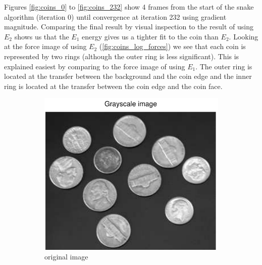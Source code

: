 \documentclass[11pt,a4paper]{article}
\begin{document}
Figures \ref{fig:coins_0} to \ref{fig:coins_232} show 4 frames from the start
of the snake algorithm (iteration 0) until convergence at iteration 232 using
gradient magnitude. Comparing the final result by visual inspection to the
result of using $E_2$ shows us that the $E_1$ energy gives us a tighter fit to
the coin than $E_2$. Looking at the force image of using $E_2$
(\ref{fig:coins_log_forces}) we see that each coin is represented by two rings
(although the outer ring is less significant). This is explained easiest by
comparing to the force image of using $E_1$. The outer ring is located at
the transfer between the background and the coin edge and the inner ring is
located at the transfer between the coin edge and the coin face.

%
\begin{figure}[H]
    \centering
    \begin{subfigure}[t]{0.24\textwidth}
        \includegraphics[width=\textwidth]{src/images/coins_gradient_gray.pdf}
        \caption{original image}
        \label{fig:coins_original}
    \end{subfigure}
    \begin{subfigure}[t]{0.24\textwidth}

\end{subfigure}
\end{figure}
\end{document}
